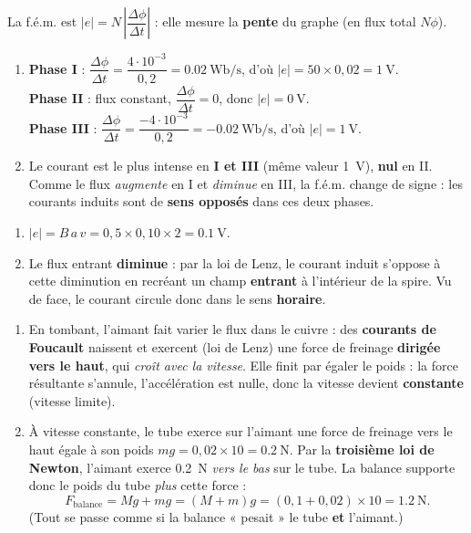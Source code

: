 \documentclass[11pt,a4paper]{article}
\begin{document}
\begin{corrige}
La f.é.m. est $|e|=N\,\left|\dfrac{\Delta\phi}{\Delta t}\right|$ : elle mesure la \textbf{pente} du
graphe (en flux total $N\phi$).
\begin{enumerate}[label=\alph*)]
  \item \textbf{Phase I} : $\dfrac{\Delta\phi}{\Delta t}=\dfrac{4\cdot10^{-3}}{0{,}2}=\qty{0.02}{\weber\per\second}$,
        d'où $|e|=50\times0{,}02=\qty{1}{\volt}$.\\
        \textbf{Phase II} : flux constant, $\dfrac{\Delta\phi}{\Delta t}=0$, donc $|e|=\qty{0}{\volt}$.\\
        \textbf{Phase III} : $\dfrac{\Delta\phi}{\Delta t}=\dfrac{-4\cdot10^{-3}}{0{,}2}=\qty{-0.02}{\weber\per\second}$,
        d'où $|e|=\qty{1}{\volt}$.
  \item Le courant est le plus intense en \textbf{I et III} (même valeur \qty{1}{\volt}), \textbf{nul} en
        II. Comme le flux \emph{augmente} en I et \emph{diminue} en III, la f.é.m. change de signe : les
        courants induits sont de \textbf{sens opposés} dans ces deux phases.
\end{enumerate}
\end{corrige}

\begin{corrige}
\begin{enumerate}[label=\alph*)]
  \item $|e|=B\,a\,v=0{,}5\times0{,}10\times2=\qty{0.1}{\volt}$.
  \item Le flux entrant \textbf{diminue} : par la loi de Lenz, le courant induit s'oppose à cette
        diminution en recréant un champ \textbf{entrant} à l'intérieur de la spire. Vu de face, le
        courant circule donc dans le sens \textbf{horaire}.
\end{enumerate}
\end{corrige}

\begin{corrige}
\begin{enumerate}[label=\alph*)]
  \item En tombant, l'aimant fait varier le flux dans le cuivre : des \textbf{courants de Foucault}
        naissent et exercent (loi de Lenz) une force de freinage \textbf{dirigée vers le haut}, qui
        \emph{croît avec la vitesse}. Elle finit par égaler le poids : la force résultante s'annule,
        l'accélération est nulle, donc la vitesse devient \textbf{constante} (vitesse limite).
  \item À vitesse constante, le tube exerce sur l'aimant une force de freinage vers le haut égale à son
        poids $mg=0{,}02\times10=\qty{0.2}{\newton}$. Par la \textbf{troisième loi de Newton}, l'aimant
        exerce \qty{0.2}{\newton} \emph{vers le bas} sur le tube. La balance supporte donc le poids du
        tube \emph{plus} cette force :
        \[ F_{\text{balance}}=Mg+mg=(M+m)g=(0{,}1+0{,}02)\times10=\qty{1.2}{\newton}. \]
        (Tout se passe comme si la balance « pesait » le tube \textbf{et} l'aimant.)
\end{enumerate}
\end{corrige}
\end{document}
